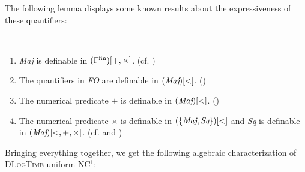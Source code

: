 \documentclass[a4paper,UKenglish,cleveref, autoref, thm-restate, anonymous]{lipics-v2021}
\begin{document}
The following lemma displays some known results about the expressiveness of these quantifiers:
\begin{lemma}\label{lem:superhelperalogtime}
    \,
    \begin{enumerate}[\ \ \ \ (i)]
        \item \emph{Maj} is definable in $(\Gamma^{\mathrm{fin}})[+,\times]$. (cf. \cite{barrington1990uniformity})
        \item The quantifiers in \emph{FO} are definable in $(\emph{Maj})[<]$. (\cite[Theorem 3.2]{lange2004some})
        \item The numerical predicate $+$ is definable in $(\emph{Maj})[<]$. (\cite[Theorem 4.1]{lange2004some})
        \item The numerical predicate $\times$ is definable in $(\{\emph{Maj}, \emph{Sq}\})[<]$ and \emph{Sq} is definable in $(\emph{Maj})[<,+,\times]$. (cf. \cite[Theorem 2.3.f]{schweikardt2002expressive} and \cite[Section 2.3]{krebs2007characterizing})
    \end{enumerate}
\end{lemma}

Bringing everything together, we get the following algebraic characterization of \textsc{DLogTime}-uniform NC${}^1$:
\end{document}
